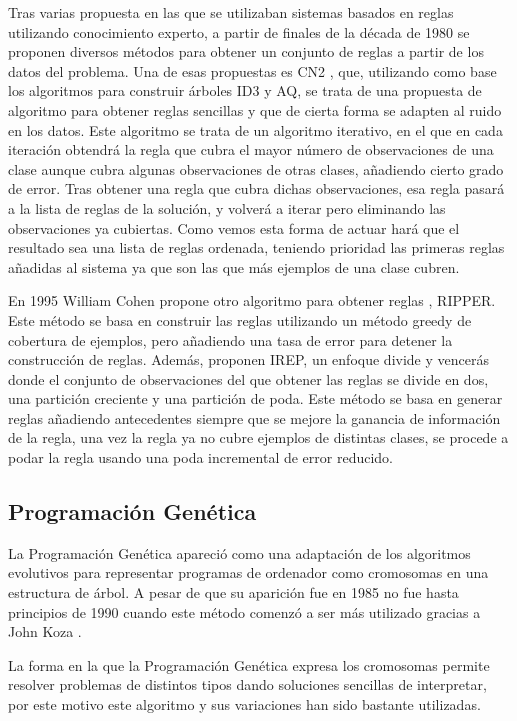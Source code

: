 Tras varias propuesta en las que se utilizaban sistemas basados en reglas utilizando conocimiento experto, a partir de finales de la década de 1980 se proponen diversos métodos para obtener un conjunto de reglas a partir de los datos del problema. Una de esas propuestas es CN2 \cite{propuestaCN2}, que, utilizando como base los algoritmos para construir árboles ID3 y AQ, se trata de una propuesta de algoritmo para obtener reglas sencillas y que de cierta forma se adapten al ruido en los datos. Este algoritmo se trata de un algoritmo iterativo, en el que en cada iteración obtendrá la regla que cubra el mayor número de observaciones de una clase aunque cubra algunas observaciones de otras clases, añadiendo cierto grado de error. Tras obtener una regla que cubra dichas observaciones, esa regla pasará a la lista de reglas de la solución, y volverá a iterar pero eliminando las observaciones ya cubiertas. Como vemos esta forma de actuar hará que el resultado sea una lista de reglas ordenada, teniendo prioridad las primeras reglas añadidas al sistema ya que son las que más ejemplos de una clase cubren.

En 1995 William Cohen propone otro algoritmo para obtener reglas \cite{propuestaRIPPER}, RIPPER. Este método se basa en construir las reglas utilizando un método greedy de cobertura de ejemplos, pero añadiendo una tasa de error para detener la construcción de reglas. Además, proponen IREP, un enfoque divide y vencerás donde el conjunto de observaciones del que obtener las reglas se divide en dos, una partición creciente y una partición de poda. Este método se basa en generar reglas añadiendo antecedentes siempre que se mejore la ganancia de información de la regla, una vez la regla ya no cubre ejemplos de distintas clases, se procede a podar la regla usando una poda incremental de error reducido.

\subsection{Programación Genética}

La Programación Genética apareció como una adaptación de los algoritmos evolutivos para representar programas de ordenador como cromosomas en una estructura de árbol. A pesar de que su aparición fue en 1985 no fue hasta principios de 1990 cuando este método comenzó a ser más utilizado gracias a John Koza \cite{kozaGP}.

La forma en la que la Programación Genética expresa los cromosomas permite resolver problemas de distintos tipos dando soluciones sencillas de interpretar, por este motivo este algoritmo y sus variaciones han sido bastante utilizadas.

